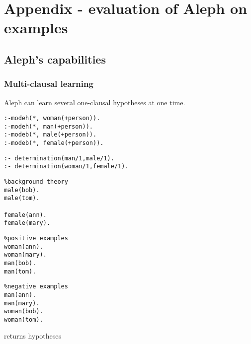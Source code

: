\chapter{Appendix - evaluation of Aleph on examples}

\section{Aleph's capabilities}

\subsection{Multi-clausal learning}\label{aleph_multiclausal_learning}
Aleph can learn several one-clausal hypotheses at one time.

\begin{minipage}[t]{.45\textwidth}
\begin{lstlisting}
:-modeh(*, woman(+person)).
:-modeh(*, man(+person)).
:-modeb(*, male(+person)).
:-modeb(*, female(+person)).
\end{lstlisting}
\end{minipage}
\begin{minipage}[t]{.20\textwidth}
\begin{lstlisting}
:- determination(man/1,male/1).
:- determination(woman/1,female/1).
\end{lstlisting}
\end{minipage}

\begin{minipage}[t]{.30\textwidth}
\begin{lstlisting}
%background theory
male(bob).
male(tom).

female(ann).
female(mary).
\end{lstlisting}
\end{minipage}
\begin{minipage}[t]{.30\textwidth}
\begin{lstlisting}
%positive examples
woman(ann).
woman(mary).
man(bob).
man(tom).
\end{lstlisting}
\end{minipage}
\begin{minipage}[t]{.30\textwidth}
\begin{lstlisting}
%negative examples
man(ann).
man(mary).
woman(bob).
woman(tom).
\end{lstlisting}
\end{minipage}

returns hypotheses

